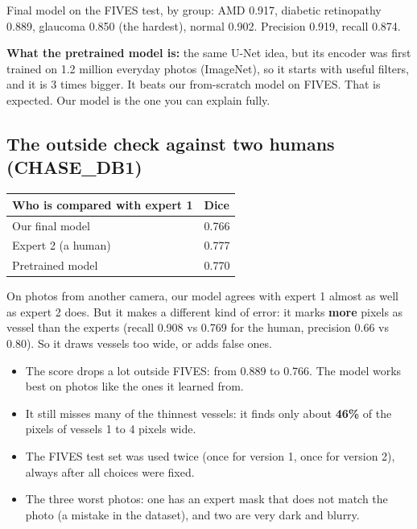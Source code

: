 \documentclass[11pt,a4paper]{article}
\begin{document}
Final model on the FIVES test, by group: AMD 0.917, diabetic retinopathy 0.889, glaucoma 0.850 (the hardest), normal 0.902. Precision 0.919, recall 0.874.

\textbf{What the pretrained model is:} the same U-Net idea, but its encoder was first trained on 1.2 million everyday photos (ImageNet), so it starts with useful filters, and it is 3 times bigger. It beats our from-scratch model on FIVES. That is expected. Our model is the one you can explain fully.

\subsection{The outside check against two humans (CHASE\_DB1)}
\begin{center}
\begin{tabular}{@{}ll@{}}
\toprule
\textbf{Who is compared with expert 1} & \textbf{Dice} \\
\midrule
Our final model & 0.766 \\
Expert 2 (a human) & 0.777 \\
Pretrained model & 0.770 \\
\bottomrule
\end{tabular}
\end{center}
On photos from another camera, our model agrees with expert 1 almost as well as expert 2 does. But it makes a different kind of error: it marks \textbf{more} pixels as vessel than the experts (recall 0.908 vs 0.769 for the human, precision 0.66 vs 0.80). So it draws vessels too wide, or adds false ones.

\begin{honest}
\begin{itemize}
  \item The score drops a lot outside FIVES: from 0.889 to 0.766. The model works best on photos like the ones it learned from.
  \item It still misses many of the thinnest vessels: it finds only about \textbf{46\%} of the pixels of vessels 1 to 4 pixels wide.
  \item The FIVES test set was used twice (once for version 1, once for version 2), always after all choices were fixed.
  \item The three worst photos: one has an expert mask that does not match the photo (a mistake in the dataset), and two are very dark and blurry.
\end{itemize}
\end{honest}
\end{document}
